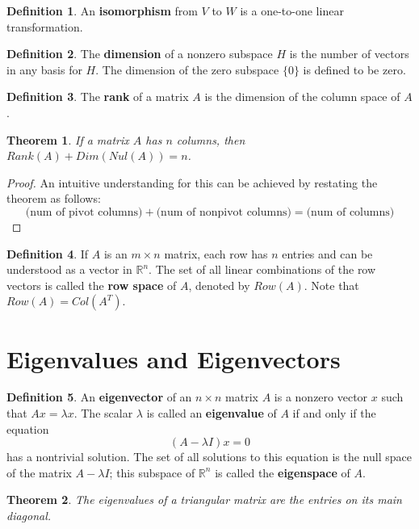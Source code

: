 \documentclass[letterpaper]{article}
\newtheorem{theorem}{Theorem}
\theoremstyle{definition}
\newtheorem{definition}{Definition}[section]
\begin{document}
\begin{definition}
An \textbf{isomorphism} from $V$ to $W$ is a one-to-one linear transformation. 
\end{definition}

\begin{definition}
The \textbf{dimension} of a nonzero subspace $H$ is the number of vectors in any basis for $H$. The dimension of the zero subspace $\{0\}$ is defined to be zero. 
\end{definition}

\begin{definition}
The \textbf{rank} of a matrix $A$ is the dimension of the column space of $A$. 
\end{definition}

\begin{theorem}
If a matrix $A$ has $n$ columns, then $Rank(A) + Dim(Nul(A)) = n$. 
\end{theorem}
\begin{proof}
An intuitive understanding for this can be achieved by restating the theorem as follows:
$$ \Big( \text{num of pivot columns} \Big) + \Big( \text{num of nonpivot columns} \Big) = \Big( \text{num of columns} \Big)   $$
\end{proof}

\begin{definition}
If $A$ is an $m \times n$ matrix, each row has $n$ entries and can be understood as a vector in $\mathbb{R}^n$. The set of all linear combinations of the row vectors is called the \textbf{row space} of $A$, denoted by $Row(A)$. Note that $Row(A) = Col(A^{T})$. 
\end{definition}

\section{Eigenvalues and Eigenvectors}
\begin{definition}
An \textbf{eigenvector} of an $n \times n$ matrix $A$ is a nonzero vector $x$ such that $Ax = \lambda x$. The scalar $\lambda$ is called an \textbf{eigenvalue} of $A$ if and only if the equation $$(A - \lambda I)x = 0$$ has a nontrivial solution. The set of all solutions to this equation is the null space of the matrix $A - \lambda I$; this subspace of $\mathbb{R}^n$ is called the \textbf{eigenspace} of $A$. 
\end{definition}

\begin{theorem}
The eigenvalues of a triangular matrix are the entries on its main diagonal. 
\end{theorem}
\end{document}
